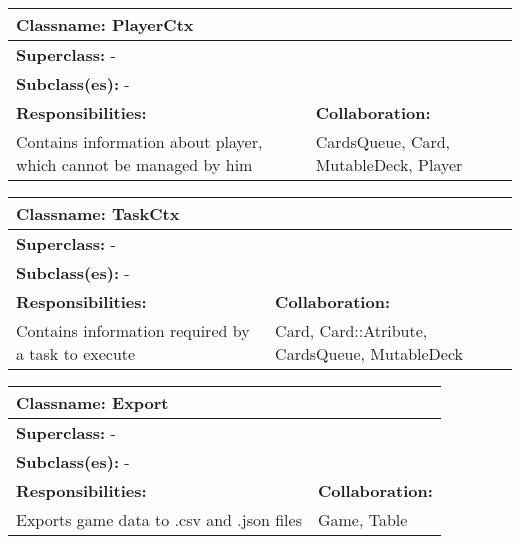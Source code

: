 \begin{table}[H]
    \centering
    \begin{tabular}{|l|l|}
         \toprule
         \multicolumn{2}{|l|}{\textbf{Classname: }PlayerCtx} \\
         \midrule
         \multicolumn{2}{|l|}{\textbf{Superclass: }-} \\
         \multicolumn{2}{|l|}{\textbf{Subclass(es): }-} \\
         \midrule
         \textbf{Responsibilities:} & \textbf{Collaboration:} \\
         Contains information about player, which cannot be managed by him & CardsQueue, Card, MutableDeck, Player \\
         \bottomrule
    \end{tabular}
    \label{tab:my_label}
\end{table}

\begin{table}[H]
    \centering
    \begin{tabular}{|l|l|}
         \toprule
         \multicolumn{2}{|l|}{\textbf{Classname: }TaskCtx} \\
         \midrule
         \multicolumn{2}{|l|}{\textbf{Superclass: }-} \\
         \multicolumn{2}{|l|}{\textbf{Subclass(es): }-} \\
         \midrule
         \textbf{Responsibilities:} & \textbf{Collaboration:} \\
         Contains information required by a task to execute & Card, Card::Atribute, CardsQueue, MutableDeck \\ 
         \bottomrule
    \end{tabular}
    \label{tab:my_label}
\end{table}

\begin{table}[H]
    \centering
    \begin{tabular}{|l|l|}
         \toprule
         \multicolumn{2}{|l|}{\textbf{Classname: }Export} \\
         \midrule
         \multicolumn{2}{|l|}{\textbf{Superclass: }-} \\
         \multicolumn{2}{|l|}{\textbf{Subclass(es): }-} \\
         \midrule
         \textbf{Responsibilities:} & \textbf{Collaboration:} \\
         Exports game data to .csv and .json files & Game, Table \\ 
         \bottomrule
    \end{tabular}
    \label{tab:my_label}
\end{table}
